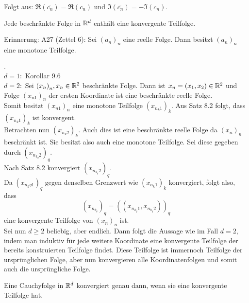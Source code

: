 \documentclass[../ana1.tex]{subfiles}
\begin{document}
\begin{bew}
	Folgt aus: \( \Re(\bar{c_n}) = \Re(c_n) \) und \( \Im(\bar{c_n}) = -\Im(c_n) \).
\end{bew}
\begin{satz}
	Jede beschränkte Folge in \(\mathbb{R}^d\) enthält eine konvergente Teilfolge.
\end{satz}
Erinnerung: A27 (Zettel 6): Sei \({(a_n)}_n\) eine reelle Folge. Dann besitzt \({(a_n)}_n\) eine monotone Teilfolge.
\begin{bew}.\\ %
	\(d=1: \) Korollar 9.6 \checkmark{}\\
	\(d=2: \) Sei \({(x_n)}_n, x_n\in\mathbb{R}^2\) beschränkte Folge. Dann ist \(x_n = (x_1,x_2)\in\mathbb{R}^2\) und Folge \({(x_{n1})}_n\) der ersten Koordinate ist eine beschränkte reelle Folge.\\
	Somit besitzt \( {(x_{n1})}_n \) eine monotone Teilfolge \( {(x_{n_k 1})}_k \). Aus Satz 8.2 folgt, dass \( {(x_{n_k 1})}_k \) ist konvergent.\\
	Betrachten nun \( {(x_{n_k 2})}_k \). Auch dies ist eine beschränkte reelle Folge da \({(x_n)}_n\) beschränkt ist. Sie besitzt also auch eine monotone Teilfolge. Sei diese gegeben durch \( {(x_{n_{k_q}2})}_q \).\\
	Nach Satz 8.2 konvergiert \({(x_{n_{k_q}2})}_q\).\\
	Da \({(x_{n_k{q}1})}_q\) gegen denselben Grenzwert wie \( {(x_{n_k 1})}_k \) konvergiert, folgt also, dass
	\[ {(x_{n_{k_q}})}_q = {((x_{n_{k_q}1}, x_{n_{k_q}2}))}_q \]
	eine konvergente Teilfolge von \({(x_n)}_n\) ist.\\
	Sei nun \( d\geq 2 \) beliebig, aber endlich. Dann folgt die Aussage wie im Fall \(d=2\), indem man induktiv für jede weitere Koordinate eine konvergente Teilfolge der bereits konstruierten Teilfolge findet. Diese Teilfolge ist immernoch Teilfolge der ursprünglichen Folge, aber nun konvergieren alle Koordinatenfolgen und somit auch die ursprüngliche Folge.
\end{bew}
\begin{lem}
	Eine Cauchyfolge in \(\mathbb{R}^d\) konvergiert genau dann, wenn sie eine konvergente Teilfolge hat.
\end{lem}
\end{document}
